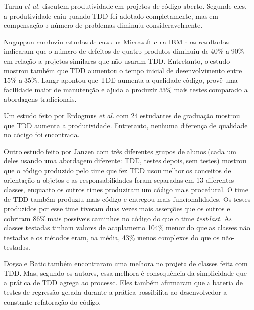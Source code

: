 \documentclass[conference]{IEEEtran}
\begin{document}
Turnu \textit{et al.} \cite{turnu-tdd-opensouce} discutem produtividade em
projetos de código aberto. Segundo eles, a produtividade caiu quando TDD foi
adotado completamente, mas em compensação o número de problemas diminuiu 
consideravelmente.

Nagappan \cite{nagappan-ms} conduziu estudos de caso na Microsoft e na IBM e os
resultados indicaram que o número de defeitos de quatro produtos diminuiu de 
40\% a 90\% em relação a projetos similares que não usaram TDD. Entretanto, o 
estudo mostrou também que TDD aumentou o tempo inicial de desenvolvimento entre 15\%
a 35\%. Langr \cite{langr} apontou que TDD aumenta a qualidade código, provê uma 
facilidade maior de manutenção e ajuda a produzir 33\% mais testes comparado a
abordagens tradicionais.

Um estudo feito por Erdogmus \textit{et al.} \cite{erdogmus-morisio} com 24 estudantes de
graduação mostrou que TDD aumenta a produtividade. Entretanto, nenhuma diferença 
de qualidade no código foi encontrada.

Outro estudo feito por Janzen \cite{janzen-saiedian} com três diferentes grupos
de alunos (cada um deles usando uma abordagem diferente: TDD, testes depois, sem
testes) mostrou que o código produzido pelo time que fez TDD usou melhor os
conceitos de orientação a objetos e as responsabilidades foram separadas em 13 
diferentes classes, enquanto os outros times produziram um código mais
procedural. O time de TDD também produziu mais código e entregou mais
funcionalidades. Os testes produzidos por esse time tiveram duas vezes mais
asserções que os outros e cobriram 86\% mais possíveis caminhos no código 
do que o time \textit{test-last}. 
As classes testadas tinham valores de acoplamento 104\% menor do 
que as classes não testadas e os métodos eram, na média, 43\% menos complexos 
do que os não-testados.

Dogsa e Batic \cite{dogsa-batic} também encontraram uma melhora no
projeto de classes feita com TDD. Mas, segundo os autores, essa melhora é 
consequência da simplicidade que a prática de TDD agrega ao processo. Eles
também  afirmaram que a bateria de testes de regressão gerada durante a prática 
possibilita ao desenvolvedor a constante refatoração do código.
\end{document}
